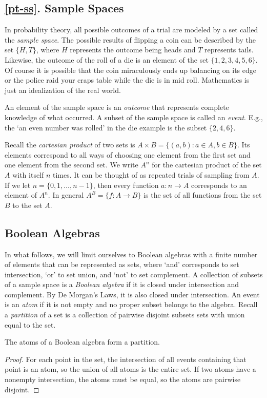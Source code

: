 \subsection{\ref{pt-ss}. Sample Spaces}
In probability theory,
all possible outcomes of a trial are modeled by a set called the {\em sample space}.
The possible results of flipping a coin can be described by the set $\{H, T\}$, where $H$ represents
the outcome being heads and $T$ represents tails. Likewise, the outcome of the roll of
a die is an element of the set $\{1,2,3,4,5,6\}$. Of course it is possible that the
coin miraculously ends up balancing on its edge or the police raid your craps table 
while the die is in mid roll. Mathematics is just an idealization of the real world.

An element of the sample space is an {\em outcome} that represents complete knowledge of what occurred.
A subset of the sample space is called an {\em event}. E.g., the `an even number was
rolled' in the die example is the subset $\{2,4,6\}$.

Recall the {\em cartesian product} of two sets is $A\times B = \{(a,b)\colon a\in A, b\in B\}$.
Its elements correspond to all ways of choosing one element from the first set and one
element from the second set.  We write $A^n$ for the cartesian product of the set $A$ with itself $n$ times.
It can be thought of as repeated trials of sampling from $A$. If we let $n = \{0, 1, \dots, n-1\}$,
then every function $a\colon n\to A$ corresponds to an element of $A^n$. In general
$A^B = \{f\colon A\to B\}$ is the set of all functions from the set $B$ to the set $A$.

\subsection{Boolean Algebras}
In what follows, we will limit ourselves to Boolean algebras with a finite number of
elements that can be represented as sets, where `and' corresponds to set intersection,
`or' to set union, and `not' to set complement. A collection of subsets of a
sample space is a
{\em Boolean algebra} if it is closed under intersection and complement. By De Morgan's
Laws, it is also closed under intersection. 
An event is an {\em atom} if it is not empty and no proper subset belongs to the algebra.
Recall a {\em partition} of a set is a collection of pairwise disjoint subsets sets with union
equal to the set.

\begin{lemma}
The atoms of a Boolean algebra form a partition.
\end{lemma}
\begin{proof}
For each point in the set, the intersection of all events containing that point is an atom,
so the union of all atoms is the entire set. If two atoms have a nonempty intersection,
the atoms must be equal, so the atoms are pairwise disjoint.
\end{proof}

